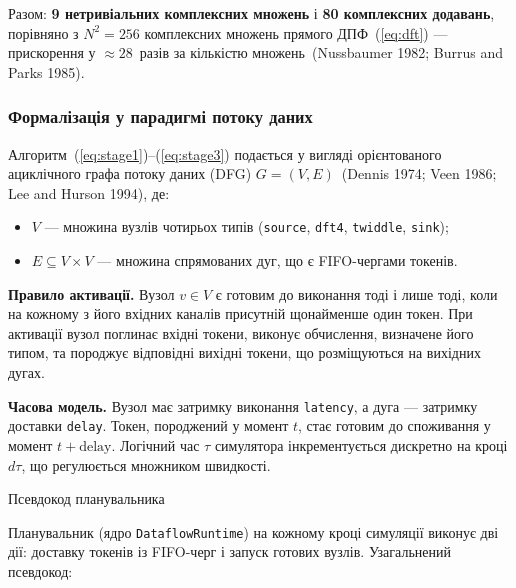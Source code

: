 Разом: \textbf{9 нетривіальних комплексних множень} і \textbf{80
комплексних додавань}, порівняно з \(N^{2} = 256\) комплексних множень
прямого ДПФ~(\hyperref[eq:dft]{{[}eq:dft{]}}) --- прискорення у
\(\approx 28\)~разів за кількістю множень~(Nussbaumer 1982; Burrus and
Parks 1985).

\subsubsection{Формалізація у парадигмі потоку
даних}\label{ux444ux43eux440ux43cux430ux43bux456ux437ux430ux446ux456ux44f-ux443-ux43fux430ux440ux430ux434ux438ux433ux43cux456-ux43fux43eux442ux43eux43aux443-ux434ux430ux43dux438ux445}

Алгоритм~(\hyperref[eq:stage1]{{[}eq:stage1{]}})--(\hyperref[eq:stage3]{{[}eq:stage3{]}})
подається у вигляді орієнтованого ациклічного графа потоку даних (DFG)
\(G = (V,E)\)~(Dennis 1974; Veen 1986; Lee and Hurson 1994), де:

\begin{itemize}
\item
  \(V\) --- множина вузлів чотирьох типів (\texttt{source},
  \texttt{dft4}, \texttt{twiddle}, \texttt{sink});
\item
  \(E \subseteq V \times V\) --- множина спрямованих дуг, що є
  FIFO-чергами токенів.
\end{itemize}

\textbf{Правило активації.} Вузол \(v \in V\) є готовим до виконання
тоді і лише тоді, коли на кожному з його вхідних каналів присутній
щонайменше один токен. При активації вузол поглинає вхідні токени,
виконує обчислення, визначене його типом, та породжує відповідні вихідні
токени, що розміщуються на вихідних дугах.

\textbf{Часова модель.} Вузол має затримку виконання \texttt{latency}, а
дуга --- затримку доставки \texttt{delay}. Токен, породжений у момент
\(t\), стає готовим до споживання у момент \(t + \text{delay}\).
Логічний час \(\tau\) симулятора інкрементується дискретно на кроці
\(d\tau\), що регулюється множником швидкості.

Псевдокод планувальника

Планувальник (ядро \texttt{DataflowRuntime}) на кожному кроці симуляції
виконує дві дії: доставку токенів із FIFO-черг і запуск готових вузлів.
Узагальнений псевдокод:

